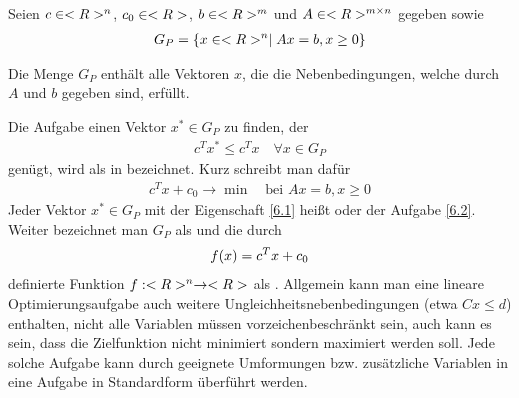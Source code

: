 Seien $c\in<R>^n$, $c_0\in<R>$, $b\in<R>^m$ und $A\in<R>^{m\times n}$ gegeben sowie
\begin{align}
	G_P = \{x\in<R>^n\mid Ax=b,x\ge 0\}\notag
\end{align}
\begin{*anmerkung}
Die Menge $G_P$ enthält alle Vektoren $x$, die die Nebenbedingungen, welche durch $A$ und $b$ gegeben sind, erfüllt.
\end{*anmerkung}
Die Aufgabe einen Vektor $x^\ast\in G_P$ zu finden, der
\begin{align}
	\label{6.1}
	c^Tx^\ast \le c^Tx\quad\forall x\in G_P
\end{align} 
genügt, wird als  in  bezeichnet. Kurz schreibt man dafür
\begin{align}
	\label{6.2}
	c^Tx+c_0\to\min\quad\text{bei } Ax=b, x\ge 0
\end{align}
Jeder Vektor $x^\ast\in G_P$ mit der Eigenschaft \cref{6.1} heißt  oder  der Aufgabe \cref{6.2}. Weiter bezeichnet man $G_P$ als  und die durch 
\begin{align}
	f(x) = c^Tx+c_0\notag
\end{align}
definierte Funktion $f:<R>^n\to<R>$ als . Allgemein kann man eine lineare Optimierungsaufgabe auch weitere Ungleichheitsnebenbedingungen (etwa $Cx\le d$) enthalten, nicht alle Variablen müssen vorzeichenbeschränkt sein, auch kann es sein, dass die Zielfunktion nicht minimiert sondern maximiert werden soll. Jede solche Aufgabe kann durch geeignete Umformungen bzw. zusätzliche Variablen in eine Aufgabe in Standardform überführt werden.

